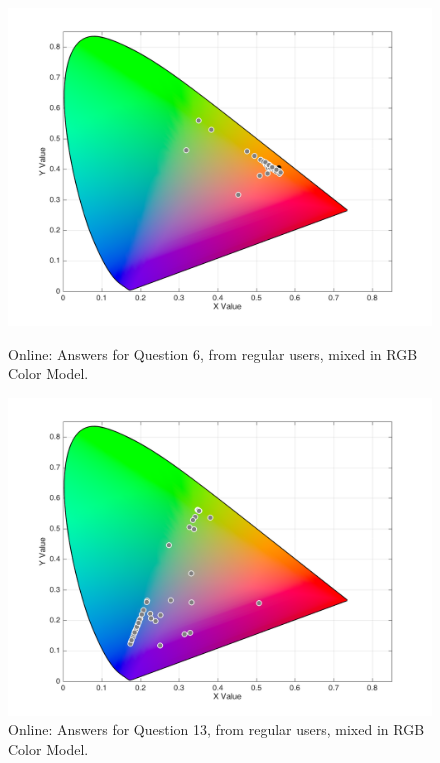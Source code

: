\begin{figure}[!htbp]
  \centering
  \vspace{-15pt}
  \begin{minipage}{0.48\textwidth}
    \centering
    \includegraphics[width=\textwidth]{images/results/6_online_RGBresponses.png}
    \caption[Online: Answers for Question 6, from regular users, mixed in RGB Color Model.]{Online: Answers for Question 6, from regular users, mixed in RGB Color Model.}
    \label{fig:onlinergbregular_6}
  \end{minipage}\hfill
  \begin{minipage}{0.48\textwidth}
    \centering
    \includegraphics[width=\textwidth]{images/results/13_online_RGBresponses.png}
    \caption[Online: Answers for Question 13, from regular users, mixed in RGB Color Model.]{Online: Answers for Question 13, from regular users, mixed in RGB Color Model.}
    \label{fig:onlinergbregular_13}
  \end{minipage}
  \vspace{-5pt}
\end{figure}

